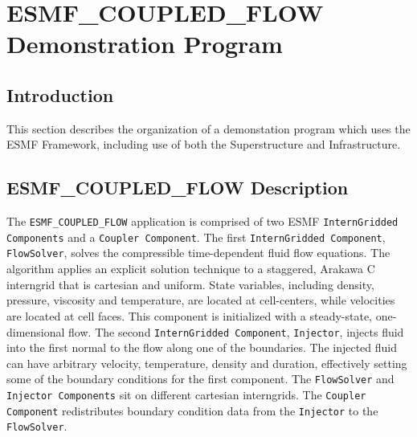
\section{ESMF\_COUPLED\_FLOW Demonstration Program}
\label{sec:demo}

\subsection{Introduction}

This section describes the organization of a
demonstation program which uses the ESMF Framework,
including use of both the 
Superstructure and Infrastructure.

\subsection{ESMF\_COUPLED\_FLOW Description}
 
The {\tt ESMF\_COUPLED\_FLOW} application is comprised of two ESMF 
{\tt InternGridded Components} and a {\tt Coupler Component}.  
The first {\tt InternGridded Component}, {\tt FlowSolver}, solves the compressible 
time-dependent fluid flow equations.  The algorithm 
applies an explicit solution technique to a staggered, Arakawa C interngrid 
that is cartesian and uniform.  State variables, including density, 
pressure, viscosity and temperature, are located at cell-centers, while 
velocities are located at cell faces.  This component is initialized 
with a steady-state, one-dimensional flow.  The second {\tt InternGridded 
Component}, {\tt Injector}, injects fluid into the first normal to the 
flow along 
one of the boundaries.  The injected fluid can have arbitrary velocity, 
temperature, density and duration, effectively setting some of 
the boundary conditions for the first component.  The {\tt FlowSolver} and 
{\tt Injector Components} sit on different cartesian interngrids.  The
{\tt Coupler Component} redistributes boundary condition data from 
the {\tt Injector} to the {\tt FlowSolver}.


